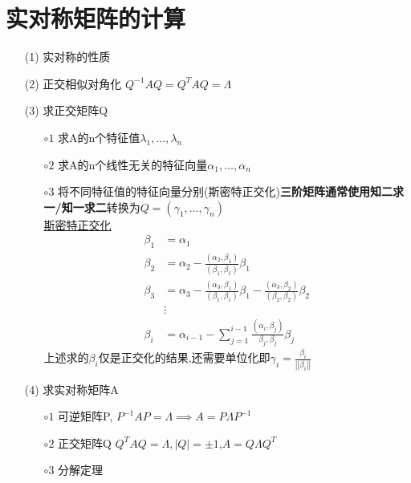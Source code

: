 \documentclass[12pt, a4paper, oneside, UTF8]{ctexbook}
\begin{document}
\section{实对称矩阵的计算}
\begin{definition}[方法]
    \begin{enumerate}
        \item [(1)] 实对称的性质 
        \item [(2)] 正交相似对角化 $Q^{-1}AQ=Q^TAQ=\Lambda$ 
        \item [(3)] 求正交矩阵Q 
            \begin{enumerate}
                \item [$\circ 1$] 求A的n个特征值$\lambda_1,\ldots,\lambda_n$ 
                \item [$\circ 2$] 求A的n个线性无关的特征向量$\alpha_1,\ldots,\alpha_n$
                \item [$\circ 3$] 将不同特征值的特征向量分别(斯密特正交化)\textbf{三阶矩阵通常使用知二求一/知一求二}转换为$Q=(\gamma_1,\ldots,\gamma_n)$ \\
                \underline{斯密特正交化}
                \begin{align*}
                    \beta_1 &=\alpha_1 \\
                    \beta_2 &=\alpha_2 - \frac{(\alpha_2,\beta_1)}{(\beta_1,\beta_1)}\beta_1 \\
                    \beta_3 &=\alpha_3 - \frac{(\alpha_3,\beta_1)}{(\beta_1,\beta_1)}\beta_1-\frac{(\alpha_3,\beta_2)}{(\beta_2,\beta_2)}\beta_2 \\
                    {} & \vdots \\
                    \beta_i &= \alpha_{i-1} - \sum_{j=1}^{i-1}\frac{(\alpha_i,\beta_j)}{\beta_j,\beta_j}\beta_j
                \end{align*} 
                上述求的$\beta_i$仅是正交化的结果,还需要单位化即$\gamma_i=\frac{\beta_i}{\left|\left|\beta_i\right|\right|}$
            \end{enumerate}
        \item [(4)] 求实对称矩阵A 
            \begin{enumerate}
                \item [$\circ 1$] 可逆矩阵P, $P^{-1}AP=\Lambda \implies A=P\Lambda P^{-1}$
                \item [$\circ 2$] 正交矩阵Q $Q^TAQ=\Lambda,\left|Q\right|=\pm 1$,$A=Q\Lambda Q^{T}$ 
                \item [$\circ 3$] 分解定理 
                \begin{align*}

\end{align*}
\end{enumerate}
\end{enumerate}
\end{definition}
\end{document}
